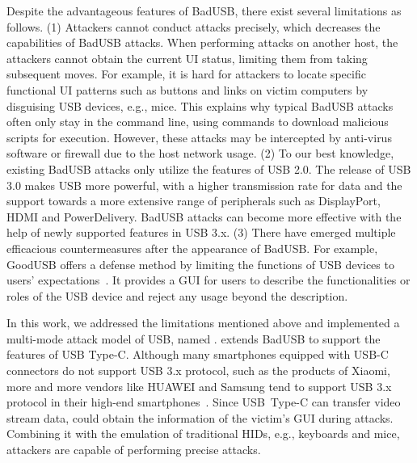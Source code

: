 Despite the advantageous features of BadUSB, there exist several limitations as
follows.  (1) Attackers cannot conduct attacks precisely, which decreases the
capabilities of BadUSB attacks.  When performing attacks on another host, the
attackers cannot obtain the current \ac{UI} status, limiting
them from taking subsequent moves.  For example, it is hard for attackers to
locate specific functional \ac{UI} patterns such as buttons and links on victim
computers by disguising \ac{USB} devices, e.g., mice.  This explains why typical
BadUSB attacks often only stay in the command line, using commands to download
malicious scripts for execution.  However, these attacks may be intercepted by
anti-virus software or firewall due to the host network usage.  (2) To
our best knowledge, existing BadUSB attacks only utilize the features of \ac{USB}
2.0.  The release of \ac{USB} 3.0 makes \ac{USB} more powerful, with a higher
transmission rate for data and the support towards a more extensive range of
peripherals such as DisplayPort, HDMI and PowerDelivery.  BadUSB attacks
can become more effective with the help of newly supported features in \ac{USB} 3.x.
(3) There have emerged multiple efficacious countermeasures after the
appearance of BadUSB.  For example, GoodUSB offers a defense method by limiting
the functions of \ac{USB} devices to users' expectations~\cite{tian2015defending}.
It provides a \ac{GUI} for users to describe the functionalities or
roles of the \ac{USB} device and reject any usage beyond the description.

In this work, we addressed the limitations mentioned
above and implemented a multi-mode attack model of \ac{USB}, named \tool.  \tool
extends BadUSB to support the features of \ac{USB} Type-C.  
Although many smartphones equipped with USB-C connectors do not support \ac{USB} 3.x protocol, such as the products of Xiaomi, more and more vendors like HUAWEI and Samsung tend to support \ac{USB} 3.x protocol in their \mbox{high-end} smartphones~\cite{usbclist}.
Since \mbox{\ac{USB} Type-C} can transfer video stream data, \tool could obtain the information of the
victim's \ac{GUI} during attacks.  Combining it with the emulation
of traditional \acp{HID}, e.g., keyboards and mice, attackers are capable of
performing precise attacks.  
 
